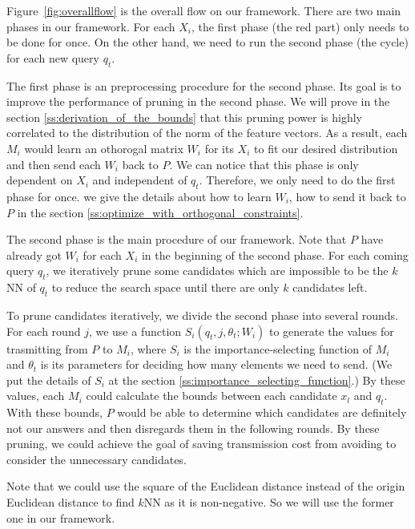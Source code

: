 Figure~\ref{fig:overallflow} is the overall flow on our framework.  There are two main phases in our framework.  For each $X_i$, the first phase (the red part) only needs to be done for once.  On the other hand, we need to run the second phase (the cycle) for each new query $q_t$.

The first phase is an preprocessing procedure for the second phase. Its goal is to improve the performance of pruning in the second phase.  We will prove in the section \ref{ss:derivation_of_the_bounds} that this pruning power is highly correlated to the distribution of the norm of the feature vectors. As a result, each $M_i$ would learn an othorogal matrix $W_i$ for its $X_i$ to fit our desired distribution and then send each $W_i$ back to $P$.  We can notice that this phase is only dependent on $X_i$ and independent of $q_t$.  Therefore, we only need to do the first phase for once.  we give the details about how to learn $W_i$, how to send it back to $P$ in the section \ref{ss:optimize_with_orthogonal_constraints}.

The second phase is the main procedure of our framework.  Note that $P$ have already got $W_i$ for each $X_i$ in the beginning of the second phase. For each coming query $q_t$, we iteratively prune some candidates which are impossible to be the $k$NN of $q_t$ to reduce the search space until there are only $k$ candidates left.

To prune candidates iteratively, we divide the second phase into several rounds.  For each round $j$, we use a function $S_i(q_t,j,\theta_t;W_i)$ to generate the values for trasmitting from $P$ to $M_i$, where $S_i$ is the importance-selecting function of $M_i$ and $\theta_t$ is its parameters for deciding how many elements we need to send.  (We put the details of $S_i$ at the section \ref{ss:importance_selecting_function}.)  By these values, each $M_i$ could calculate the bounds between each candidate $x_l$ and $q_t$.  With these bounds, $P$ would be able to determine which candidates are definitely not our answers and then disregards them in the following rounds.  By these pruning, we could achieve the goal of saving transmission cost from avoiding to consider the unnecessary candidates.

Note that we could use the square of the Euclidean distance instead of the origin Euclidean distance to find $k$NN as it is non-negative.  So we will use the former one in our framework.

